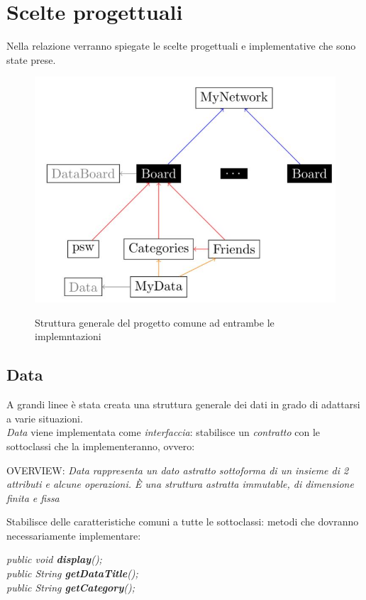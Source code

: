 \documentclass[10pt, a4paper]{article}
\begin{document}
\clearpage

\section{Scelte progettuali}
Nella relazione verranno spiegate le scelte progettuali e implementative che sono state prese.

\begin{figure}[h!]
	\centering
	\includegraphics[scale=0.4]{diag1}
	\label{fig:diag1}
	\caption{Struttura generale del progetto comune ad entrambe le implemntazioni}
\end{figure}

\subsection{Data}
A grandi linee è stata creata una struttura generale dei dati in grado di adattarsi a varie situazioni.\\ \textit{Data} viene implementata come \textit{interfaccia}: stabilisce un \textit{contratto} con le sottoclassi che la implementeranno, ovvero: 
\begin{center}
OVERVIEW: \textit{Data rappresenta un dato astratto sottoforma di un insieme di 2 attributi e alcune operazioni. È una struttura astratta immutable, di dimensione finita e fissa}
\end{center}
Stabilisce delle caratteristiche comuni a tutte le sottoclassi: metodi che dovranno necessariamente implementare: 
\begin{center}
\textit{public void \textbf{display}();\\public String \textbf{getDataTitle}();\\public 		String \textbf{getCategory}();}
\end{center}
\end{document}
